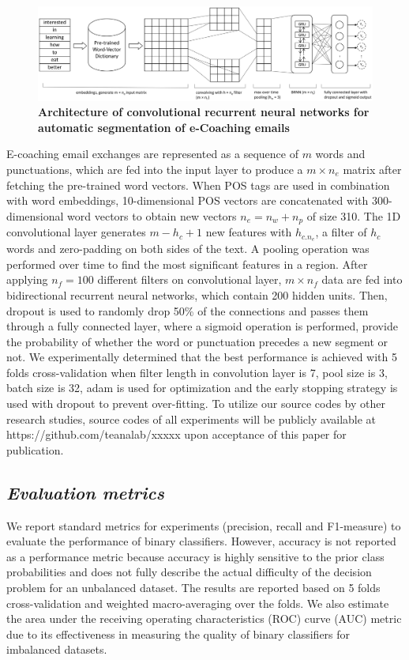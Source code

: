 \documentclass{amia}
\begin{document}
\begin{figure}[!htb]
    \centering
    \includegraphics[width=1.0\textwidth]{figures/CRNN.eps}
    \caption{\textbf{Architecture of convolutional recurrent neural networks for automatic segmentation of e-Coaching emails}}
    \label{fig:crnn}
\end{figure}

E-coaching email exchanges are represented as a sequence of $m$ words and punctuations, which are fed into the input layer to produce a $m \times n_e$ matrix after fetching the pre-trained word vectors. When POS tags are used in combination with word embeddings, 10-dimensional POS vectors are concatenated with 300-dimensional word vectors to obtain new vectors $n_e = n_w + n_p$ of size 310. The 1D convolutional layer generates $m - h_c + 1$ new features with $h_{c.n_e}$, a filter of $h_c$ words and zero-padding on both sides of the text. A pooling operation was performed over time to find the most significant features in a region. After applying $n_f=100$ different filters on convolutional layer, $m \times n_f$ data are fed into bidirectional recurrent neural networks, which contain 200 hidden units. Then, dropout is used to randomly drop 50\% of the connections and passes them through a fully connected layer, where a sigmoid operation is performed, provide the probability of whether the word or punctuation precedes a new segment or not. We experimentally determined that the best performance is achieved with 5 folds cross-validation when filter length in convolution layer is 7, pool size is 3, batch size is 32, adam\cite{kingma2014adam} is used for optimization and the early stopping strategy is used with dropout to prevent over-fitting. To utilize our source codes by other research studies, source codes of all experiments will be publicly available at https://github.com/teanalab/xxxxx upon acceptance of this paper for publication.                    
  
\subsection*{\textit{Evaluation metrics}}
We report standard metrics for experiments (precision, recall and F1-measure) to evaluate the performance of binary classifiers.\cite{aas1999text} However, accuracy is not reported as a performance metric because accuracy is highly sensitive to the prior class probabilities and does not fully describe the actual difficulty of the decision problem for an unbalanced dataset. The results are reported based on 5 folds cross-validation and weighted macro-averaging over the folds. We also estimate the area under the receiving operating characteristics (ROC) curve\cite{kumar2011receiver} (AUC) metric due to its effectiveness in measuring the quality of binary classifiers for imbalanced datasets. \cite{hu2015kernelized}
\end{document}
